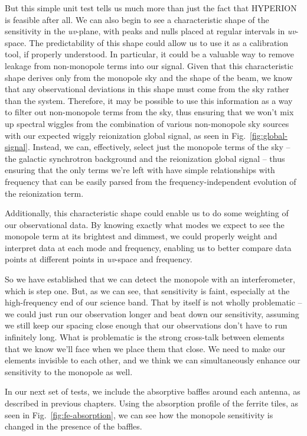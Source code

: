 But this simple unit test tells us much more than just the fact that HYPERION 
is feasible after all. We can also begin to see a characteristic shape of the 
sensitivity in the \emph{uv}-plane, with peaks and nulls placed at regular 
intervals in \emph{uv}-space. The predictability of this shape could allow us 
to use it as a calibration tool, if properly understood. In particular, it 
could be a valuable way to remove leakage from non-monopole terms into our 
signal. Given that this characteristic shape derives only from the monopole sky 
and the shape of the beam, we know that any observational deviations in this 
shape must come from the sky rather than the system. Therefore, it may be 
possible to use this information as a way to filter out non-monopole terms from 
the sky, thus ensuring that we won't mix up spectral wiggles from the 
combination of various non-monopole sky sources with our expected wiggly 
reionization global signal, as seen in Fig.~\ref{fig:global-signal}. Instead, 
we can, effectively, select just the monopole terms of the sky -- the galactic 
synchrotron background and the reionization global signal -- thus ensuring that 
the only terms we're left with have simple relationships with frequency that 
can be easily parsed from the frequency-independent evolution of the 
reionization term.

Additionally, this characteristic shape could enable  us to do some weighting 
of our observational data. By knowing exactly what modes we expect to see the 
monopole term at its brightest and dimmest, we could properly weight and 
interpret data at each mode and frequency, enabling us to better compare data 
points at different points in \emph{uv}-space and frequency.

So we have established that we can detect the monopole with an interferometer, 
which is step one. But, as we can see, that sensitivity is faint, especially at 
the high-frequency end of our science band. That by itself is not wholly 
problematic -- we could just run our observation longer and beat down our 
sensitivity, assuming we still keep our spacing close enough that our 
observations don't have to run infinitely long. What is problematic is the 
strong cross-talk between elements that we know we'll face when we place them 
that close. We need to make our elements invisible to each other, and we think 
we can simultaneously enhance our sensitivity to the monopole as well.

In our next set of tests, we include the absorptive baffles around each 
antenna, as described in previous chapters. Using the absorption profile of the 
ferrite tiles, as seen in Fig.~\ref{fig:fe-absorption}, we can see how the 
monopole sensitivity is changed in the presence of the baffles.

